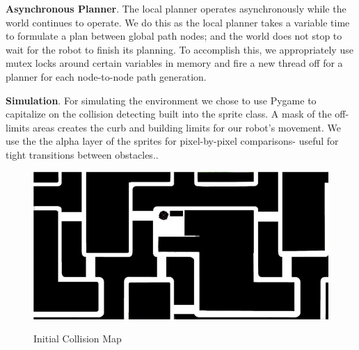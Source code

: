 \documentclass{article}
\begin{document}
\begin{multicols}{2}
\noindent \textbf{Asynchronous Planner}. The local planner operates asynchronously while the world continues to operate. We do this as the local planner takes a variable time to formulate a plan between global path nodes; and the world does not stop to wait for the robot to finish its planning. To accomplish this, we appropriately use mutex locks around certain variables in memory and fire a new thread off for a planner for each node-to-node path generation.

\noindent \textbf{Simulation}. For simulating the environment we chose to use Pygame to capitalize on the collision detecting built into the sprite class.  A mask of the off-limits areas creates the curb and building limits for our robot's movement. We use the the alpha layer of the sprites for pixel-by-pixel comparisons- useful for tight transitions between obstacles..\
\begin{figure}[H]
   \centering
    \includegraphics[width = 1\columnwidth]{figures/mask.png}
     \label{fig:mask}
     \caption{Initial Collision Map}
\end{figure}


\end{multicols}
\end{document}
